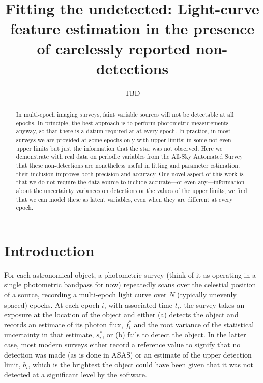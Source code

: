 \documentclass[12pt,preprint]{aastex}
\newcommand{\fobs}{f_i^*}
\newcommand{\sobs}{s_i^*}
\begin{document}

\shortauthors{}
\title{Fitting the undetected:  Light-curve feature estimation in the presence of carelessly reported non-detections}
\author{
TBD
}
%



\begin{abstract}
In multi-epoch imaging surveys, faint variable sources will not be
detectable at all epochs.  In principle, the best approach is to
perform photometric measurements anyway, so that there is a datum
required at at every epoch.  In practice, in most surveys we are
provided at some epochs only with upper limits; in some not even upper
limits but just the information that the star was not observed.  Here
we demonstrate with real data on periodic variables from the All-Sky
Automated Survey that these non-detections are nonetheless useful in
fitting and parameter estimation; their inclusion improves both
precision and accuracy.  One novel aspect of this work is that we do
not require the data source to include accurate---or even
any---information about the uncertainty variances on detections or the
values of the upper limits; we find that we can model these as latent
variables, even when they are different at every epoch.
\end{abstract}


\section{Introduction}
\label{sec:intro}


For each astronomical object, a photometric survey (think of it as operating in a single photometric bandpass for now) repeatedly scans over the celestial position of a source, recording a multi-epoch light curve over $N$ (typically unevenly spaced) epochs.  At each epoch $i$, with associated time $t_i$, the survey takes an exposure at the location of the object and either (a) detects the object and records an estimate of its photon flux, $\fobs$ and the root variance of the statistical uncertainty in that estimate, $\sobs$, or (b) fails to detect the object.  In the latter case, most modern surveys either record a reference value to signify that no detection was made (as is done in ASAS) or an estimate of the upper detection limit, $b_i$, which is the brightest the object could have been given that it was not detected at a significant level by the software.
\end{document}
